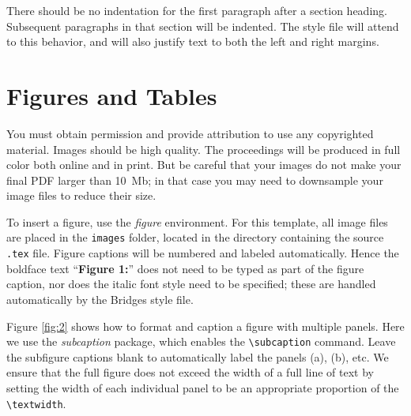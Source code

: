 \documentclass[letterpaper,11pt]{article}
\begin{document}
There should be no indentation for the first paragraph after a section heading. Subsequent paragraphs in that section will be indented. The style file will attend to this behavior, and will also justify text to both the left and right margins. 

\section*{Figures and Tables}

You must obtain permission and provide attribution to use any copyrighted material. 
Images should be high quality. The proceedings will be produced in full color both online and in print.
But be careful that your images do not make your final PDF larger than 10~Mb;
in that case you may need to downsample your image files to reduce their size.

To insert a figure, use the \emph{figure} environment. For this template, all
image files are placed in the \texttt{images} folder, located in the directory containing the source 
\texttt{.tex} file. Figure captions will be numbered and labeled automatically. Hence the boldface text 
``\textbf{Figure 1:}'' does not need to be typed as part of the figure caption, nor does the 
italic font style need to be specified; these are handled automatically by the Bridges style file.

Figure \ref{fig:2} shows how to format and caption a figure with multiple panels. 
Here we use the \emph{subcaption} package, which enables the \verb|\subcaption| 
command. Leave the subfigure captions blank to automatically label the panels 
(a), (b), etc. We ensure that the full figure does not exceed the width of a full line 
of text by setting the width of each individual panel to be an appropriate proportion of the 
\verb|\textwidth|.
\end{document}
